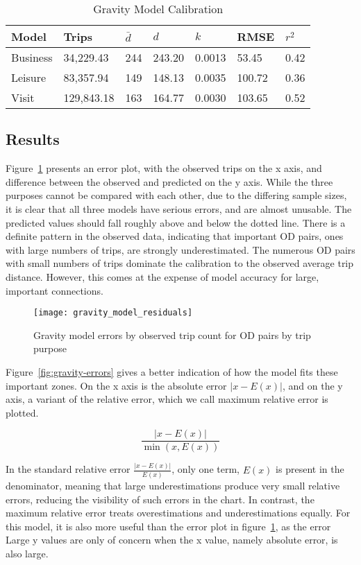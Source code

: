 \begin{table}[H]
\centering
\caption{Gravity Model Calibration}
\label{table:gravity-calibration}
\begin{tabular}{@{}lllll|ll@{}}
\toprule
Model & Trips & $\bar{d}$ & $d$ & $k$ & RMSE & $r^2$ \\ \midrule
   Business  & 34,229.43  &     244     &  243.20   & 0.0013 & 53.45  & 0.42  \\
   Leisure   & 83,357.94  &     149     &  148.13   & 0.0035 & 100.72  & 0.36  \\
   Visit     & 129,843.18 &     163     &  164.77   & 0.0030 & 103.65 & 0.52  \\ \bottomrule
\end{tabular}
\end{table}


\subsection{Results}
Figure~\ref{fig:gravity-residuals} presents an error plot, with the observed trips on the x axis, and difference between the observed and predicted on the y axis. While the three purposes cannot be compared with each other, due to the differing sample sizes, it is clear that all three models have serious errors, and are almost unusable. The predicted values should fall roughly above and below the dotted line. There is a definite pattern in the observed data, indicating that important OD pairs, ones with large numbers of trips, are strongly underestimated. The numerous OD pairs with small numbers of trips dominate the calibration to the observed average trip distance. However, this comes at the expense of model accuracy for large, important connections.

\begin{figure}[H]
\centering
\texttt{[image: gravity\_model\_residuals]}
\caption{Gravity model errors by observed trip count for OD pairs by trip purpose}
\label{fig:gravity-residuals}
\end{figure}

Figure~\ref{fig:gravity-errors} gives a better indication of how the model fits these important zones. On the x axis is the absolute error $|x - E(x)|$, and on the y axis, a variant of the relative error, which we call maximum relative error is plotted. 

$$\frac{|x-E(x)|}{\min(x, E(x))}$$

In the standard relative error $\frac{|x-E(x)|}{E(x)}$, only one term, $E(x)$ is present in the denominator, meaning that large underestimations produce very small relative errors, reducing the visibility of such errors in the chart. In contrast, the maximum relative error treats overestimations and underestimations equally. For this model, it is also more useful than the error plot in figure~\ref{fig:gravity-residuals}, as the error Large y values are only of concern when the x value, namely absolute error, is also large.

